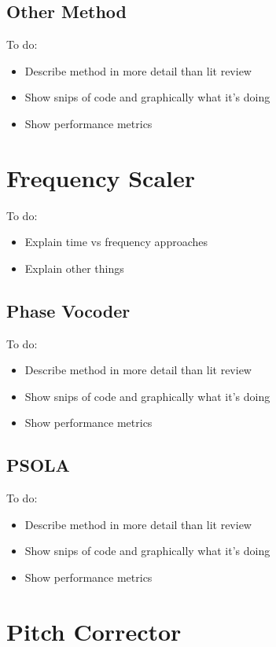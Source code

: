 \subsection{Other Method}

\color{red}
To do:
\begin{itemize}
	\item Describe method in more detail than lit review
	\item Show snips of code and graphically what it's doing
	\item Show performance metrics
\end{itemize}
\color{black}

\section{Frequency Scaler}

\color{red}
To do:
\begin{itemize}
	\item Explain time vs frequency approaches
	\item Explain other things
\end{itemize}
\color{black}

\subsection{Phase Vocoder}

\color{red}
To do:
\begin{itemize}
	\item Describe method in more detail than lit review
	\item Show snips of code and graphically what it's doing
	\item Show performance metrics
\end{itemize}
\color{black}

\subsection{PSOLA}

\color{red}
To do:
\begin{itemize}
	\item Describe method in more detail than lit review
	\item Show snips of code and graphically what it's doing
	\item Show performance metrics
\end{itemize}
\color{black}

\section{Pitch Corrector}

